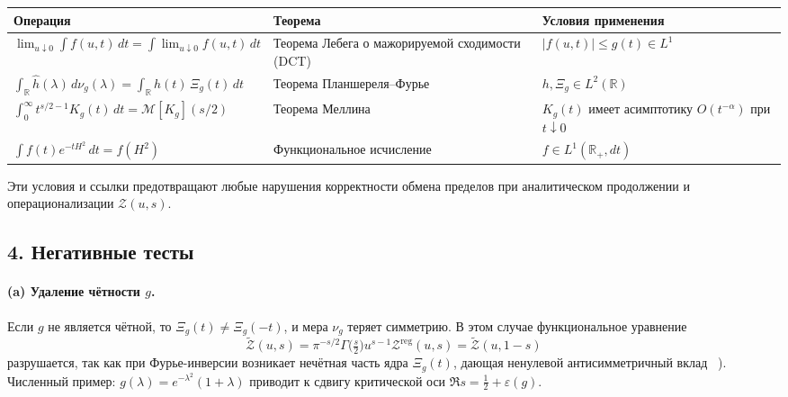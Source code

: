 \documentclass{article}
\numberwithin{equation}{section}
\theoremstyle{plain}
\theoremstyle{definition}
\theoremstyle{remark}
\def\alpha{α}\def\beta{β}\def\gamma{γ}\def\Gamma{Γ}%
\def\infty{∞}\def\partial{∂}\def\sum{Σ}\def\int{∫}%
\begin{document}
\begin{center}
	\renewcommand{\arraystretch}{1.2}
	\begin{tabular}{|p{}|p{}|p{}|}
		\hline
		\textbf{Операция} & \textbf{Теорема} & \textbf{Условия применения} \\
		\hline
		$\displaystyle \lim_{u\downarrow 0}\!\int f(u,t)\,dt = \int \!\lim_{u\downarrow 0}f(u,t)\,dt$
		& Теорема Лебега о мажорируемой сходимости (DCT)~\cite{Folland1999}
		& $|f(u,t)|\le g(t)\in L^1$ \\
		\hline
		$\displaystyle \int_{\mathbb R} \widehat h(\lambda)\,d\nu_g(\lambda)
		= \int_{\mathbb R} h(t)\,\Xi_g(t)\,dt$
		& Теорема Планшереля–Фурье~\cite{SteinWeiss1971}
		& $h,\Xi_g\in L^2(\mathbb R)$ \\
		\hline
		$\displaystyle \int_0^\infty t^{s/2-1}K_g(t)\,dt = \mathcal M[K_g](s/2)$
		& Теорема Меллина~\cite{Titchmarsh1986}
		& $K_g(t)$ имеет асимптотику $O(t^{-\alpha})$ при $t\downarrow0$ \\
		\hline
		$\displaystyle \int f(t)e^{-tH^2}\,dt = f(H^2)$
		& Функциональное исчисление~\cite{ReedSimonI}
		& $f\in L^1(\mathbb R_+,dt)$ \\
		\hline
	\end{tabular}
\end{center}
Эти условия и ссылки предотвращают любые нарушения корректности обмена пределов при аналитическом продолжении и операционализации $\mathcal Z(u,s)$.

\subsection*{4. Негативные тесты}
\label{sec:negative-tests}

\paragraph{(a) Удаление чётности $g$.}
Если $g$ не является чётной, то $\Xi_g(t)\ne \Xi_g(-t)$, и мера $\nu_g$ теряет симметрию.  
В этом случае функциональное уравнение
\begin{equation}
\widetilde{\mathcal Z}(u,s)=\pi^{-s/2}\Gamma\!\big(\tfrac s2\big)u^{s-1}\mathcal Z^{\mathrm{reg}}(u,s)
=\widetilde{\mathcal Z}(u,1-s)
\end{equation}
разрушается, так как при Фурье-инверсии возникает нечётная часть ядра $\Xi_g(t)$, дающая ненулевой антисимметричный вклад ~\cite{Hecke1936}).  
Численный пример: $g(\lambda)=e^{-\lambda^2}(1+\lambda)$ приводит к сдвигу критической оси $\Re s=\frac12+\varepsilon(g)$.
\end{document}
